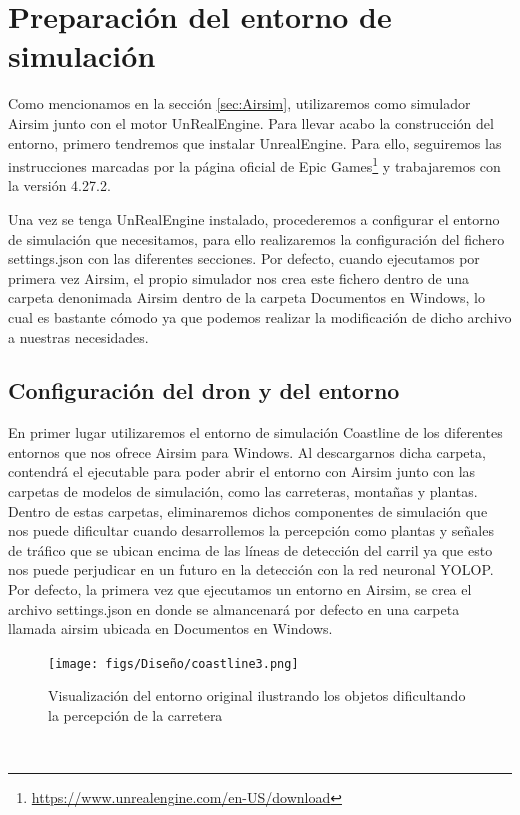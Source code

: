 \section{Preparación del entorno de simulación}
\label{sec:Preparación_entorno}

Como mencionamos en la sección \ref{sec:Airsim}, utilizaremos como simulador Airsim junto con el motor UnRealEngine. Para llevar acabo la construcción del entorno, primero tendremos 
que instalar UnrealEngine. Para ello, seguiremos las instrucciones marcadas por la página oficial de Epic Games\footnote{\url{https://www.unrealengine.com/en-US/download}} y trabajaremos con la versión 4.27.2. 

Una vez se tenga UnRealEngine instalado, procederemos a configurar el entorno de simulación que necesitamos, para ello realizaremos la configuración del fichero settings.json con las diferentes
secciones. Por defecto, cuando ejecutamos por primera vez Airsim, el propio simulador nos crea este fichero dentro de una carpeta denonimada Airsim dentro de la carpeta Documentos en Windows, lo cual
es bastante cómodo ya que podemos realizar la modificación de dicho archivo a nuestras necesidades. 


\subsection{Configuración del dron y del entorno}
\label{subsec:Configuración del dron y del entorno}

En primer lugar utilizaremos el entorno de simulación Coastline de los diferentes entornos que nos ofrece Airsim para Windows. Al descargarnos dicha carpeta, contendrá el ejecutable para
poder abrir el entorno con Airsim junto con las carpetas de modelos de simulación, como las carreteras, montañas y plantas. Dentro de estas carpetas, eliminaremos dichos componentes 
de simulación que nos puede dificultar cuando desarrollemos la percepción como plantas y señales de tráfico que se ubican encima de las líneas de detección del carril ya que esto nos puede perjudicar
en un futuro en la detección con la red neuronal YOLOP.\newline
Por defecto, la primera vez que ejecutamos un entorno en Airsim, se crea el archivo settings.json en donde se almancenará por defecto en una carpeta 
llamada airsim ubicada en Documentos en Windows. \newline

\begin{figure} [H]
  \begin{center}
    \texttt{[image: figs/Diseño/coastline3.png]}
  \end{center}
  \caption{Visualización del entorno original ilustrando los objetos dificultando la
  percepción de la carretera}
  \label{fig:CoastlineModificado}
\end{figure}\

